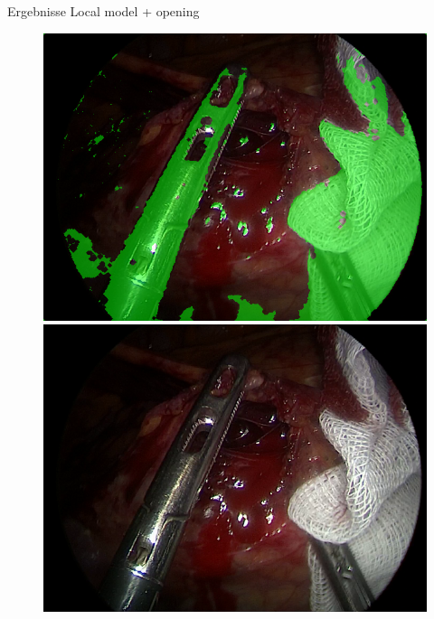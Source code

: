 \begin{frame}{Ergebnisse Local model + opening}
    \begin{figure}[ht]
        \begin{minipage}[b]{0.45\linewidth}
            \centering
            \includegraphics[width=\textwidth]{../images/model-303/img_16_raw-overlay.png}\\
            \includegraphics[width=\textwidth]{../images/op4-img_17.png}
        \end{minipage}
        \hspace{0.5cm}
        \begin{minipage}[b]{0.45\linewidth}
            \centering

\end{minipage}
\end{figure}
\end{frame}

